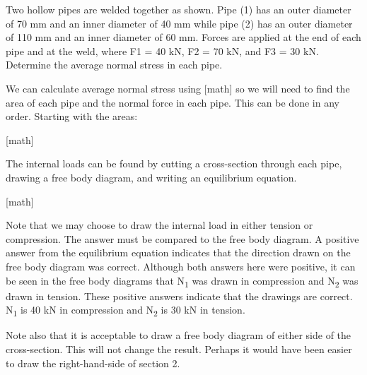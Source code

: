 \documentclass[
  letterpaper,
  DIV=11,
  numbers=noendperiod]{scrreprt}
\begin{document}
\begin{tcolorbox}[enhanced jigsaw, colback=white, colframe=quarto-callout-note-color-frame, leftrule=.75mm, opacitybacktitle=0.6, colbacktitle=quarto-callout-note-color!10!white, arc=.35mm, bottomrule=.15mm, breakable, title={Example 2.2: Normal stress with multiple loads/sections}, left=2mm, titlerule=0mm, toptitle=1mm, toprule=.15mm, opacityback=0, rightrule=.15mm, coltitle=black, bottomtitle=1mm]

Two hollow pipes are welded together as shown. Pipe (1) has an outer
diameter of 70 mm and an inner diameter of 40 mm while pipe (2) has an
outer diameter of 110 mm and an inner diameter of 60 mm. Forces are
applied at the end of each pipe and at the weld, where F1 = 40 kN, F2 =
70 kN, and F3 = 30 kN. Determine the average normal stress in each pipe.

\begin{tcolorbox}[enhanced jigsaw, colback=white, colframe=quarto-callout-note-color-frame, leftrule=.75mm, opacitybacktitle=0.6, colbacktitle=quarto-callout-note-color!10!white, arc=.35mm, bottomrule=.15mm, breakable, title={Solution}, left=2mm, titlerule=0mm, toptitle=1mm, toprule=.15mm, opacityback=0, rightrule=.15mm, coltitle=black, bottomtitle=1mm]

We can calculate average normal stress using {[}math{]} so we will need
to find the area of each pipe and the normal force in each pipe. This
can be done in any order. Starting with the areas:

{[}math{]}

The internal loads can be found by cutting a cross-section through each
pipe, drawing a free body diagram, and writing an equilibrium equation.

{[}math{]}

Note that we may choose to draw the internal load in either tension or
compression. The answer must be compared to the free body diagram. A
positive answer from the equilibrium equation indicates that the
direction drawn on the free body diagram was correct. Although both
answers here were positive, it can be seen in the free body diagrams
that N\textsubscript{1} was drawn in compression and N\textsubscript{2}
was drawn in tension. These positive answers indicate that the drawings
are correct. N\textsubscript{1} is 40 kN in compression and
N\textsubscript{2} is 30 kN in tension.

Note also that it is acceptable to draw a free body diagram of either
side of the cross-section. This will not change the result. Perhaps it
would have been easier to draw the right-hand-side of section 2.


\end{tcolorbox}
\end{tcolorbox}
\end{document}
